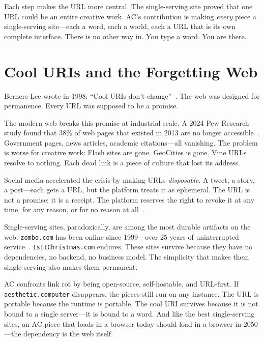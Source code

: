 \documentclass[10pt,letterpaper,twocolumn]{article}
\newcommand{\code}[1]{\texttt{#1}}
\begin{document}
Each step makes the URL more central. The single-serving site proved that one URL could be an entire creative work. AC's contribution is making \emph{every} piece a single-serving site---each a word, each a world, each a URL that is its own complete interface. There is no other way in. You type a word. You are there.

\section{Cool URIs and the Forgetting Web}

Berners-Lee wrote in 1998: ``Cool URIs don't change''~\citep{berners-lee1998cool}. The web was designed for permanence. Every URL was supposed to be a promise.

The modern web breaks this promise at industrial scale. A 2024 Pew Research study found that 38\% of web pages that existed in 2013 are no longer accessible~\citep{pew2024linkrot}. Government pages, news articles, academic citations---all vanishing. The problem is worse for creative work: Flash sites are gone. GeoCities is gone. Vine URLs resolve to nothing. Each dead link is a piece of culture that lost its address.

Social media accelerated the crisis by making URLs \emph{disposable}. A tweet, a story, a post---each gets a URL, but the platform treats it as ephemeral. The URL is not a promise; it is a receipt. The platform reserves the right to revoke it at any time, for any reason, or for no reason at all~\citep{hrw2020videounavailable}.

Single-serving sites, paradoxically, are among the most durable artifacts on the web. \code{zombo.com} has been online since 1999---over 25 years of uninterrupted service~\citep{zombocom1999}. \code{IsItChristmas.com} endures. These sites survive because they have no dependencies, no backend, no business model. The simplicity that makes them single-serving also makes them permanent.

AC confronts link rot by being open-source, self-hostable, and URL-first. If \code{aesthetic.computer} disappears, the pieces still run on any instance. The URL is portable because the runtime is portable. The cool URI survives because it is not bound to a single server---it is bound to a word. And like the best single-serving sites, an AC piece that loads in a browser today should load in a browser in 2050---the dependency is the web itself.
\end{document}
